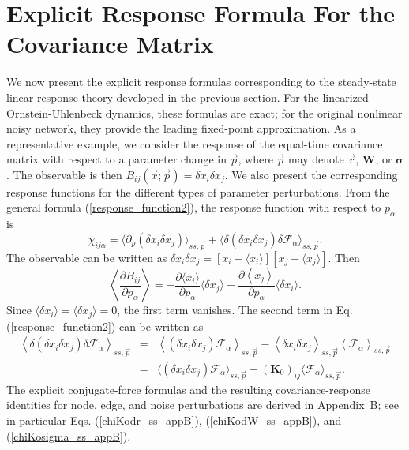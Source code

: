 \section{Explicit Response Formula For the Covariance Matrix}
\quad We now present the explicit response formulas corresponding to the steady-state linear-response theory developed in the previous section. For the linearized Ornstein-Uhlenbeck dynamics, these formulas are exact; for the original nonlinear noisy network, they provide the leading fixed-point approximation. As a representative example, we consider the response of the equal-time covariance matrix with respect to a parameter change in $\vec{p}$, where $\vec{p}$ may denote $\vec{r}$, $\mathbf{W}$, or $\boldsymbol{\sigma}$. The observable is then $B_{ij}(\vec{x}; \vec{p})=\delta x_i \delta x_j$. We also present the corresponding response functions for the different types of parameter perturbations. From the general formula (\ref{response_function2}), the response function with respect to $p_\alpha$ is
\begin{equation}
    \chi_{ij\alpha} = \langle \partial_p (\delta x_i \delta x_j) \rangle_{ss, \vec{p}} + \langle \delta (\delta x_i \delta x_j) \delta \mathscr{F}_\alpha \rangle_{ss, \vec{p}}.
\end{equation}
The observable can be written as $\delta x_i \delta x_j= [x_i - \langle x_i \rangle][x_j - \langle x_j \rangle]$. Then
\begin{equation}
    \left\langle \frac{\partial B_{ij}}{\partial p_\alpha} \right\rangle = -\frac{\partial \langle x_i \rangle}{\partial p_\alpha} \langle \delta x_j \rangle - \frac{\partial \left\langle x_j \right\rangle}{\partial p_\alpha} \langle \delta x_i \rangle.
\end{equation}
Since $\langle \delta x_i \rangle = \langle \delta x_j \rangle = 0$, the first term vanishes. The second term in Eq. (\ref{response_function2}) can be written as
\begin{eqnarray}
    \left\langle \delta (\delta x_i \delta x_j) \delta \mathscr{F}_\alpha \right\rangle_{ss, \vec{p}} &=& \left\langle (\delta x_i \delta x_j) \mathscr{F}_\alpha \right\rangle_{ss, \vec{p}} - \left\langle \delta x_i \delta x_j \right\rangle_{ss, \vec{p}} \left\langle \mathscr{F}_\alpha \right\rangle_{ss, \vec{p}}\nonumber\\
    &=& \langle (\delta x_i \delta x_j) \mathscr{F}_\alpha \rangle_{ss, \vec{p}} - (\mathbf{K}_0)_{ij} \langle \mathscr{F}_\alpha \rangle_{ss, \vec{p}}.
\end{eqnarray}
The explicit conjugate-force formulas and the resulting covariance-response identities for node, edge, and noise perturbations are derived in Appendix~B; see in particular Eqs. (\ref{chiKodr_ss_appB}), (\ref{chiKodW_ss_appB}), and (\ref{chiKosigma_ss_appB}).

